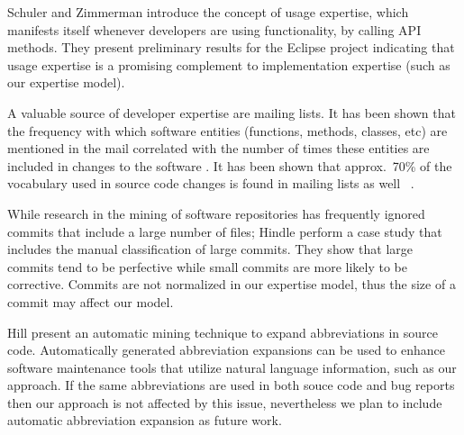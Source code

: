 Schuler and Zimmerman \cite{Schu08a} introduce the concept of usage expertise, which manifests itself whenever developers are using functionality, \eg by calling API methods. They present preliminary
results for the Eclipse project indicating that usage expertise is a promising complement to implementation expertise (such as our expertise model). 


A valuable source of developer expertise are mailing lists. It has been shown that the frequency with which software entities (functions, methods, classes, etc) are mentioned in the mail correlated with the number of times these entities are included in changes to the software \cite{Patt08a}. It has been shown that approx.\ 70\% of the vocabulary used in source code changes is found in mailing lists as well~ \cite{Bays07a}.


 While research in the mining of software repositories has frequently ignored commits that include a large number of files; 
Hindle \etal \cite{Hind08b} perform a case study that includes the manual classification of large commits. They show that large commits tend to be perfective while small commits are more likely to be corrective. Commits are not normalized in our expertise model, thus the size of a commit may affect our model. 


Hill \etal \cite{Hill08a} present an automatic mining technique to expand abbreviations in source code.  Automatically generated abbreviation expansions can be used to enhance software maintenance tools that utilize natural language information, such as our approach. If the same abbreviations are used in both souce code and bug reports then our approach is not affected by this issue, nevertheless we plan to include  automatic abbreviation expansion as future work.

